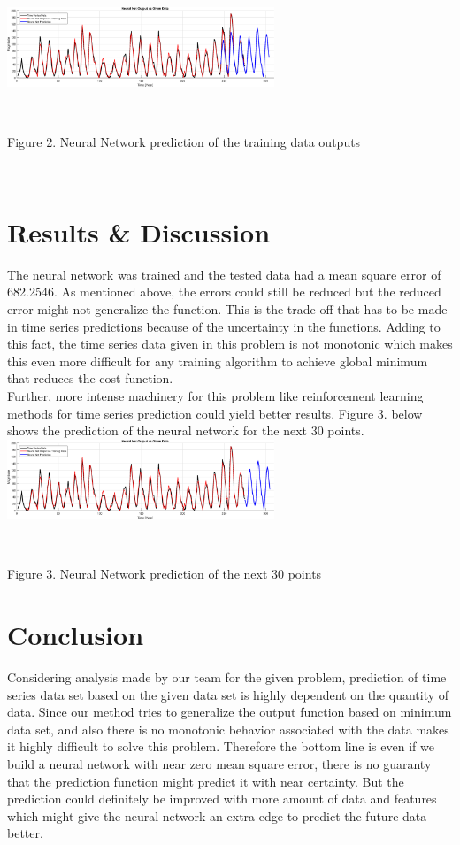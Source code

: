 \documentclass[conference]{IEEEtran}
\begin{document}
\includegraphics[scale=0.6, width=8cm]{figure2.eps}

\\
\begin{center}Figure 2. Neural Network prediction of the training data outputs\end{center}\\

\section{Results & Discussion}

The neural network was trained and the tested data had a mean square error of 682.2546. As mentioned above, the errors could still be reduced but the reduced error might not generalize the function. This is the trade off that has to be made in time series predictions because of the uncertainty in the functions. Adding to this fact, the time series data given in this problem is not monotonic which makes this even more difficult for any training algorithm to achieve global minimum that reduces the cost function.\\

Further, more intense machinery for this problem like reinforcement learning methods for time series prediction could yield better results. Figure 3. below shows the prediction of the neural network for the next 30 points.\\

\includegraphics[scale=0.6, width=8cm]{figure1.eps}

\\
\begin{center}Figure 3. Neural Network prediction of the next 30 points\end{center}

\section{Conclusion}
Considering analysis made by our team for the given problem, prediction of time series data set based on the given data set is highly dependent on the quantity of data. Since our method tries to generalize the output function based on minimum data set, and also there is no monotonic behavior associated with the data makes it highly difficult to solve this problem. Therefore the bottom line is even if we build a neural network with near zero mean square error, there is no guaranty that the prediction function might predict it with near certainty. But the prediction could definitely be improved with more amount of data and features which might give the neural network an extra edge to predict the future data better.
\end{document}
